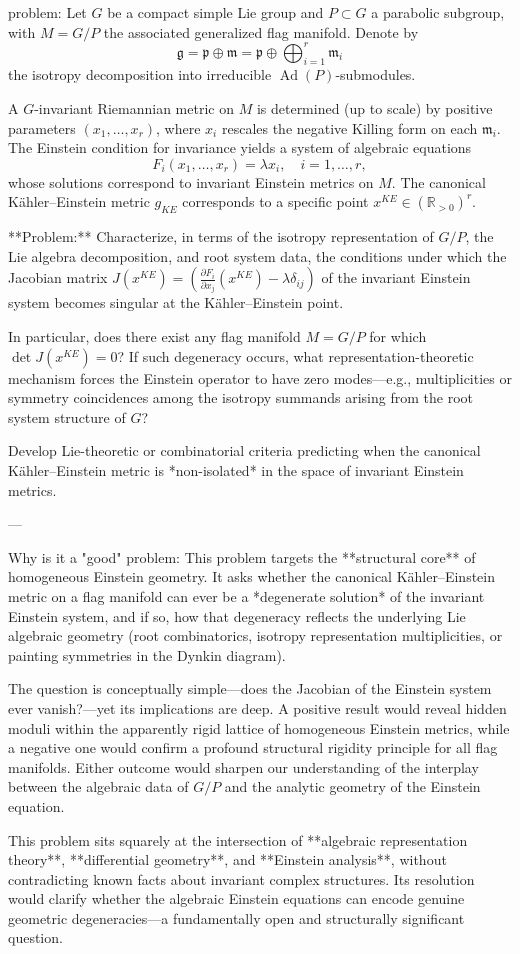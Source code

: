 problem:  
Let \( G \) be a compact simple Lie group and \( P \subset G \) a parabolic subgroup, with \( M = G/P \) the associated generalized flag manifold. Denote by  
\[
\mathfrak{g} = \mathfrak{p} \oplus \mathfrak{m} = \mathfrak{p} \oplus \bigoplus_{i=1}^r \mathfrak{m}_i
\]
the isotropy decomposition into irreducible \( \operatorname{Ad}(P) \)-submodules.  

A \( G \)-invariant Riemannian metric on \( M \) is determined (up to scale) by positive parameters \( (x_1, \dots, x_r) \), where \( x_i \) rescales the negative Killing form on each \(\mathfrak{m}_i\). The Einstein condition for invariance yields a system of algebraic equations
\[
F_i(x_1,\dots,x_r) = \lambda x_i,\quad i=1,\dots,r,
\]
whose solutions correspond to invariant Einstein metrics on \( M \). The canonical Kähler–Einstein metric \(g_{KE}\) corresponds to a specific point \(x^{KE} \in (\mathbb{R}_{>0})^r\).

**Problem:**  
Characterize, in terms of the isotropy representation of \(G/P\), the Lie algebra decomposition, and root system data, the conditions under which the Jacobian matrix \(J(x^{KE}) = \left( \frac{\partial F_i}{\partial x_j}(x^{KE}) - \lambda \delta_{ij} \right)\) of the invariant Einstein system becomes singular at the Kähler–Einstein point.  

In particular, does there exist any flag manifold \( M = G/P \) for which \( \det J(x^{KE}) = 0 \)?  
If such degeneracy occurs, what representation-theoretic mechanism forces the Einstein operator to have zero modes—e.g., multiplicities or symmetry coincidences among the isotropy summands arising from the root system structure of \(G\)?

Develop Lie-theoretic or combinatorial criteria predicting when the canonical Kähler–Einstein metric is *non-isolated* in the space of invariant Einstein metrics.

---

Why is it a "good" problem:  
This problem targets the **structural core** of homogeneous Einstein geometry. It asks whether the canonical Kähler–Einstein metric on a flag manifold can ever be a *degenerate solution* of the invariant Einstein system, and if so, how that degeneracy reflects the underlying Lie algebraic geometry (root combinatorics, isotropy representation multiplicities, or painting symmetries in the Dynkin diagram).

The question is conceptually simple—does the Jacobian of the Einstein system ever vanish?—yet its implications are deep. A positive result would reveal hidden moduli within the apparently rigid lattice of homogeneous Einstein metrics, while a negative one would confirm a profound structural rigidity principle for all flag manifolds. Either outcome would sharpen our understanding of the interplay between the algebraic data of \(G/P\) and the analytic geometry of the Einstein equation.

This problem sits squarely at the intersection of **algebraic representation theory**, **differential geometry**, and **Einstein analysis**, without contradicting known facts about invariant complex structures. Its resolution would clarify whether the algebraic Einstein equations can encode genuine geometric degeneracies—a fundamentally open and structurally significant question.